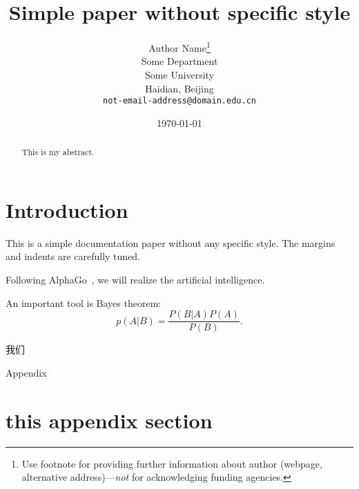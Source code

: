\documentclass[11pt]{article}
\begin{document}
\title{Simple paper without specific style}
\author{Author Name\thanks{Use footnote for providing further information
    about author (webpage, alternative address)---\emph{not} for acknowledging
    funding agencies.} \\
  Some Department\\
  Some University\\
  Haidian, Beijing \\
  \texttt{not-email-address@domain.edu.cn} \\
}
\date{\today}
\maketitle
%



\begin{abstract}
This is my abstract.
\end{abstract}


\section{Introduction}
This is a simple documentation paper without any specific style. The margins and indents are carefully tuned. 

Following AlphaGo~\cite{silver2016mastering}, we will realize the artificial intelligence.

An important tool is Bayes theorem:
\begin{equation}
    p(A|B) = \frac{P(B|A)P(A)}{P(B)}.
\end{equation}

我们




\clearpage
{\centering \huge Appendix}
\appendix
\section{this appendix section}
\end{document}
